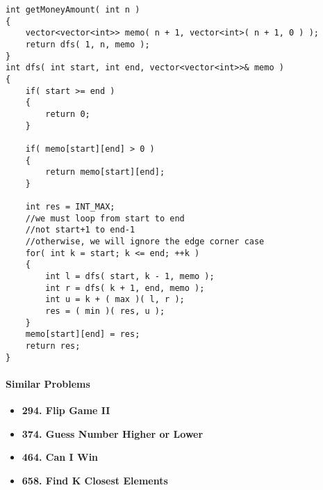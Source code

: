 \begin{lstlisting}[style=customc, caption={Memorization}]
int getMoneyAmount( int n )
{
    vector<vector<int>> memo( n + 1, vector<int>( n + 1, 0 ) );
    return dfs( 1, n, memo );
}
int dfs( int start, int end, vector<vector<int>>& memo )
{
    if( start >= end )
    {
        return 0;
    }

    if( memo[start][end] > 0 )
    {
        return memo[start][end];
    }

    int res = INT_MAX;
    //we must loop from start to end
    //not start+1 to end-1
    //otherwise, we will ignore the edge corner case
    for( int k = start; k <= end; ++k )
    {
        int l = dfs( start, k - 1, memo );
        int r = dfs( k + 1, end, memo );
        int u = k + ( max )( l, r );
        res = ( min )( res, u );
    }
    memo[start][end] = res;
    return res;
}
\end{lstlisting}

\paragraph{Similar Problems}
\begin{itemize}
\item \textbf{294. Flip Game II}
\item \textbf{374. Guess Number Higher or Lower}
\item \textbf{464. Can I Win}
\item \textbf{658. Find K Closest Elements}
\end{itemize}